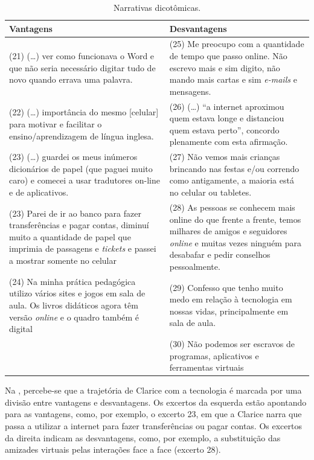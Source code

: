 \documentclass{textolivre-html}
\begin{document}
\begin{table}[htpb]
\caption{Narrativas dicotômicas.}
\label{tbl-tabela-02}
\begin{tabular}{p{}p{}}
\toprule
\textbf{Vantagens} & \textbf{Desvantagens} \\
\midrule
(21) (\ldots) ver como funcionava o Word e que não seria necessário digitar tudo de novo quando errava uma palavra. &
(25) Me preocupo com a quantidade de tempo que passo online. Não escrevo mais e sim digito, não mando mais cartas e sim \textit{e-mails} e mensagens. \\
(22) (\ldots) importância do mesmo {[}celular{]} para motivar e facilitar o ensino/aprendizagem de língua inglesa. &
(26) (\ldots) “a internet aproximou quem estava longe e distanciou quem estava perto”, concordo plenamente com esta afirmação. \\
(23) (\ldots) guardei os meus inúmeros dicionários de papel (que paguei muito caro) e comecei a usar tradutores on-line e de aplicativos. &
(27) Não vemos mais crianças brincando nas festas e/ou correndo como antigamente, a maioria está no celular ou tabletes. \\
(23) Parei de ir ao banco para fazer transferências e pagar contas, diminuí muito a quantidade de papel que imprimia de passagens e \textit{tickets} e passei a mostrar somente no celular &
(28) As pessoas se conhecem mais online do que frente a frente, temos milhares de amigos e seguidores \textit{online} e muitas vezes ninguém para desabafar e pedir conselhos pessoalmente. \\
(24) Na minha prática pedagógica utilizo vários sites e jogos em sala de aula. Os livros didáticos agora têm versão \textit{online} e o quadro também é digital &
(29) Confesso que tenho muito medo em relação à tecnologia em nossas vidas, principalmente em sala de aula. \\
 &
(30) Não podemos ser escravos de programas, aplicativos e ferramentas virtuais \\
\bottomrule
\end{tabular}
\end{table}

Na , percebe-se que a trajetória de Clarice com a tecnologia é marcada por uma divisão entre vantagens e desvantagens. Os excertos da esquerda estão apontando para as vantagens, como, por exemplo, o excerto 23, em que a Clarice narra que passa a utilizar a internet para fazer transferências ou pagar contas. Os excertos da direita indicam as desvantagens, como, por exemplo, a substituição das amizades virtuais pelas interações face a face (excerto 28). 
\end{document}
